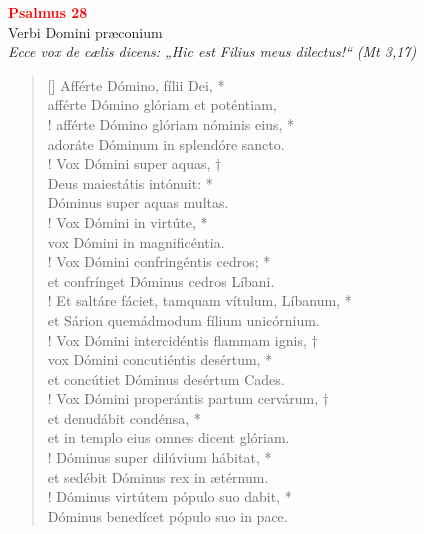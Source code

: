 


\def\greinitialformat#1{%
{\fontsize{39}{39}\selectfont #1}%
}




\vspace{0.3cm}
\begin{center}
 \textcolor{red}{\large \bf Psalmus 28}\\
Verbi Domini præconium\\
\textit{\small Ecce vox de cælis dicens: „Hic est Filius meus dilectus!“ (Mt 3,17)}
\end{center}
\begin{verse}[\versewidth]
Afférte Dómino, fílii Dei, *\\
afférte Dómino glóriam et poténtiam,\\!
\vin afférte Dómino glóriam nóminis eius, *\\
\vin adoráte Dóminum in splendóre sancto.\\!
Vox Dómini super aquas, †\\
Deus maiestátis intónuit: *\\
Dóminus super aquas multas.\\!
\vin Vox Dómini in virtúte, *\\
\vin vox Dómini in magnificéntia.\\!
Vox Dómini confringéntis cedros; *\\
et confrínget Dóminus cedros Líbani.\\!
\vin Et saltáre fáciet, tamquam vítulum, Líbanum, *\\
\vin et Sárion quemádmodum fílium unicórnium.\\!
Vox Dómini intercidéntis flammam ignis, †\\
vox Dómini concutiéntis desértum, *\\
et concútiet Dóminus desértum Cades.\\!
\vin Vox Dómini properántis partum cervárum, †\\
\vin et denudábit condénsa, *\\
\vin et in templo eius omnes dicent glóriam.\\!
Dóminus super dilúvium hábitat, *\\
et sedébit Dóminus rex in ætérnum.\\!
\vin Dóminus virtútem pópulo suo dabit, *\\
\vin Dóminus benedícet pópulo suo in pace.\\
\end{verse}
\vspace{1cm}


